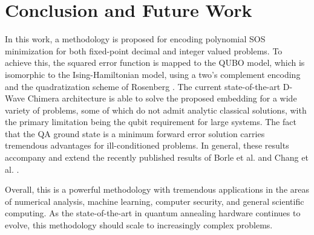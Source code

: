 \section{Conclusion and Future Work}

In this work, a methodology is proposed for encoding polynomial SOS minimization for both fixed-point decimal and integer valued problems.
To achieve this, the squared error function is mapped to the QUBO model, which is isomorphic to the Ising-Hamiltonian model, using a two's complement encoding and the quadratization scheme of Rosenberg \cite{rosenberg1975reduction}.
The current state-of-the-art D-Wave Chimera architecture is able to solve the proposed embedding for a wide variety of problems, some of which do not admit analytic classical solutions, with the primary limitation being the qubit requirement for large systems.
The fact that the QA ground state is a minimum forward error solution carries tremendous advantages for ill-conditioned problems.
In general, these results accompany and extend the recently published results of Borle et al. \cite{borle2019analyzing} and Chang et al. \cite{chang2019quantum}.

Overall, this is a powerful methodology with tremendous applications in the areas of numerical analysis, machine learning, computer security, and general scientific computing.
As the state-of-the-art in quantum annealing hardware continues to evolve, this methodology should scale to increasingly complex problems.